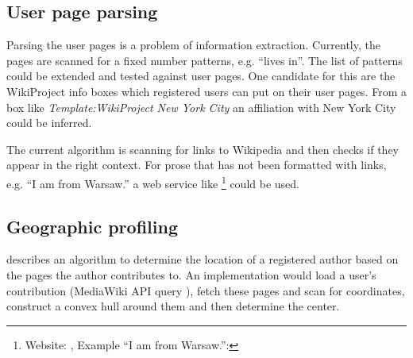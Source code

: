 \subsection{User page parsing}

Parsing the user pages is a problem of information extraction.
Currently, the pages are scanned for a fixed number patterns, e.g. ``lives in''.
The list of patterns could be extended and tested against user pages.
One candidate for this are the WikiProject info boxes which registered users can put on their user pages.
From a box like \emph{Template:WikiProject New York City} an affiliation with New York City could be inferred.

The current algorithm is scanning for links to Wikipedia and then checks if they appear in the right context.
For prose that has not been formatted with links, e.g. ``I am from Warsaw.'' a web service like \footnote{Website: , Example ``I am from Warsaw.'': } could be used.

\subsection{Geographic profiling}

\textcite{lieberman2009you} describes an algorithm to determine the location of a registered author based on the pages the author contributes to.
An implementation would load a user's contribution (MediaWiki \ac{API} query ), fetch these pages and scan for coordinates, construct a convex hull around them and then determine the center.
